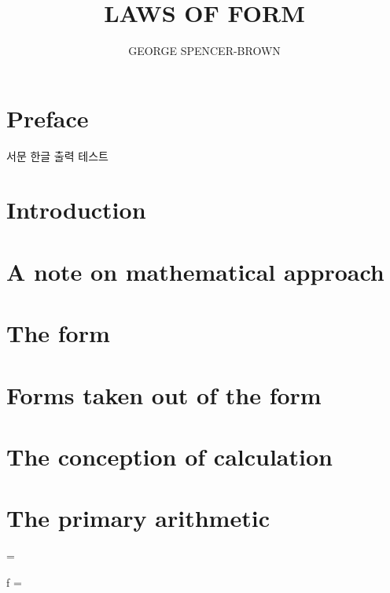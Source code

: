 \documentclass[11pt, a4paper]{book}
\title{LAWS OF FORM}
\author{GEORGE SPENCER-BROWN}
\begin{document}
\newpage
\maketitle

\tableofcontents

\newpage
{}
\section*{Preface}
서문 한글 출력 테스트

\newpage
{}
\section*{Introduction}

\newpage
{}
\section*{A note on mathematical approach}

\newpage
\section{The form}

\newpage
\section{Forms taken out of the form}

\newpage
\section{The conception of calculation}

\newpage
\section{The primary arithmetic}

\begin{form}
	\Lambda = 
\end{form}

\begin{form}
	f =  
\end{form}
\end{document}
